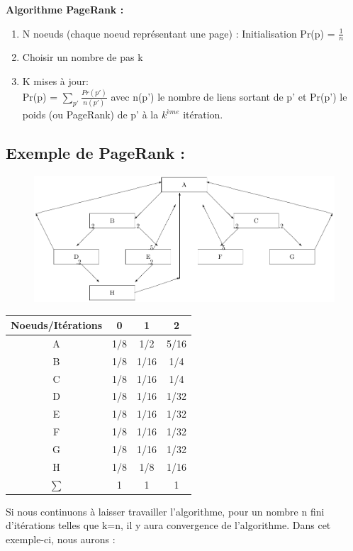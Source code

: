 \textbf{ Algorithme PageRank :}
\begin{enumerate}
	\item N noeuds (chaque noeud représentant une page) :
	Initialisation Pr(p) =  $\frac{1}{n}$
	\item Choisir un nombre de pas k
	\item K mises à jour:\\
	Pr(p) = $ \sum_ {p'}\frac{Pr(p')}{n(p')} $ avec n(p') le nombre de liens sortant de p' et Pr(p') le poids (ou PageRank) de p' à la $k^{ème}$ itération.
\end{enumerate}
\subsection*{Exemple de PageRank :}

\begin{figure}[h!]
\centering
 \includegraphics[scale=0.8]{images/24_imagePr.pdf}
\label{graphPageRank}
\end{figure}

 
 	\begin{tabular}{|c| c |c |c |}
		\hline
		Noeuds/Itérations & 0 & 1 & 2 \\
		\hline
		A & 1/8 & 1/2 & 5/16 \\
		B & 1/8 & 1/16 &  1/4   \\
		C & 1/8 & 1/16 & 1/4    \\
		D & 1/8 & 1/16 & 1/32  \\
		E & 1/8 & 1/16 &  1/32   \\
		F & 1/8 & 1/16 & 1/32    \\
		G & 1/8 & 1/16 & 1/32    \\
		H & 1/8 & 1/8 &  1/16   \\
		\hline
		$\sum $ & 1 & 1 & 1 \\
		\hline
	\end{tabular}


 Si nous continuons à laisser travailler l'algorithme, pour un nombre n fini d'itérations telles que k=n, il y aura convergence de l'algorithme. Dans cet exemple-ci,  nous aurons :

